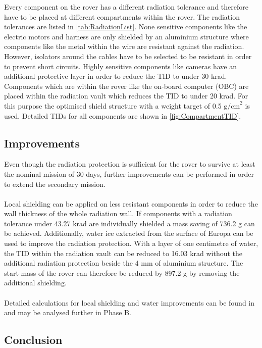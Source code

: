 Every component on the rover has a different radiation tolerance and therefore have to be placed at different compartments within the rover. The radiation tolerances are listed in \autoref{tab:RadiationList}. None sensitive components like the electric motors and harness are only shielded by an aluminium structure where components like the metal within the wire are resistant against the radiation. However, isolators around the cables have to be selected to be resistant in order to prevent short circuits. Highly sensitive components like cameras have an additional protective layer in order to reduce the TID to under 30 krad. Components which are within the rover like the on-board computer (OBC) are placed within the radiation vault which reduces the TID to under 20 krad. For this purpose the optimised shield structure with a weight target of 0.5 \(\text{g/cm}^2\) is used. Detailed TIDs for all components are shown in \autoref{fig:CompartmentTID}.

\subsection{Improvements}

\label{subsec:RadiationImprovements}

Even though the radiation protection is sufficient for the rover to survive at least the nominal mission of 30 days, further improvements can be performed in order to extend the secondary mission. \\ \\
Local shielding can be applied on less resistant components in order to reduce the wall thickness of the whole radiation wall. If components with a radiation tolerance under 43.27 krad are individually shielded a mass saving of 736.2 g can be achieved. Additionally, water ice extracted from the surface of Europa can be used to improve the radiation protection. With a layer of one centimetre of water, the TID within the radiation vault can be reduced to 16.03 krad without the additional radiation protection beside the 4 mm of aluminium structure. The start mass of the rover can therefore be reduced by 897.2 g by removing the additional shielding. \\ \\
Detailed calculations for local shielding and water improvements can be found in  and may be analysed further in Phase B.

\subsection{Conclusion}

